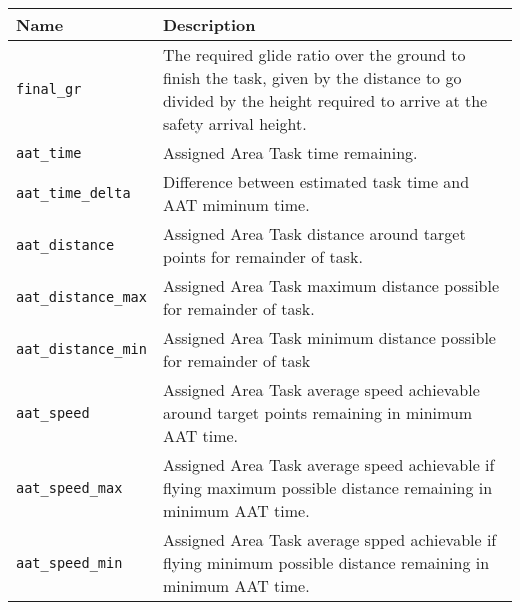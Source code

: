 \begin{maxipage}
\begin{tabularx}{1.9\textwidth}{l|X}
Name & Description \\
\hline\hline

\verb|final_gr| & The required glide ratio over the ground to finish 
the task, given by \newline the distance to go divided by the height 
required to arrive at the safety \newline arrival height. \\

\hline

\verb|aat_time| & Assigned Area Task time remaining. \\

\hline

\verb|aat_time_delta| & Difference between estimated task time and 
AAT miminum time.\\

\hline

\verb|aat_distance| & Assigned Area Task distance around target points 
for remainder of \newline task. \\

\hline

\verb|aat_distance_max| & Assigned Area Task maximum distance possible 
for remainder of \newline task. \\

\hline

\verb|aat_distance_min| & Assigned Area Task minimum distance possible 
for remainder of  \newline task\\

\hline

\verb|aat_speed| & Assigned Area Task average speed achievable around 
target points \newline remaining in minimum AAT time. \\

\hline

\verb|aat_speed_max| & Assigned Area Task average speed achievable 
if flying maximum \newline possible distance remaining in minimum 
AAT time. \\

\hline

\verb|aat_speed_min| & Assigned Area Task average spped achievable 
if flying minimum \newline possible distance remaining in minimum 
AAT time.  \\


\end{tabularx}
\end{maxipage}
